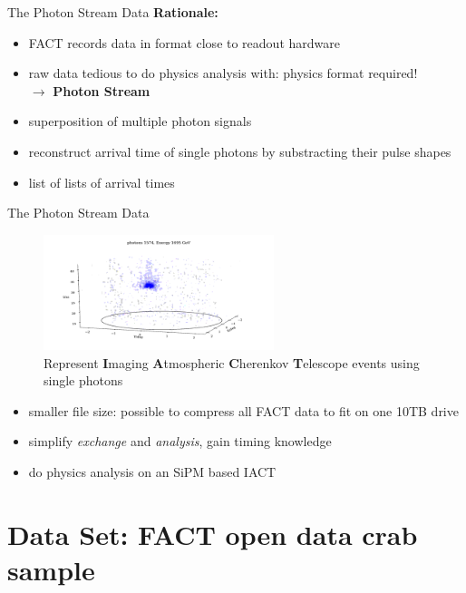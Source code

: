 \begin{frame}[t]{The Photon Stream Data}
    \large{\textbf{Rationale:}}
    \begin{itemize}
        \item FACT records data in format close to readout hardware
        \item raw data tedious to do physics analysis with: physics format required! \\ $\rightarrow$ \textbf{Photon Stream}
        \item superposition of multiple photon signals
        \item reconstruct arrival time of single photons by substracting their pulse shapes
        \item list of lists of arrival times 
    \end{itemize}
\end{frame}

\begin{frame}[t]{The Photon Stream Data}
    \begin{multicols}{2}
    \begin{figure}
        \centering
        \includegraphics[width=0.6\textwidth]{fig/event/example_event_small-15.png}
        \caption{Represent \textbf{I}maging \textbf{A}tmospheric \textbf{C}herenkov \textbf{T}elescope events using single photons}
    \end{figure}
    \columnbreak
    \begin{itemize}
        \item smaller file size: possible to compress all FACT data to fit on one 10TB drive 
        \item simplify \textit{exchange} and \textit{analysis}, gain timing knowledge
        \item do physics analysis on an SiPM based IACT    
    \end{itemize}
    \end{multicols}
\end{frame}



\section{Data Set: FACT open data crab sample}

